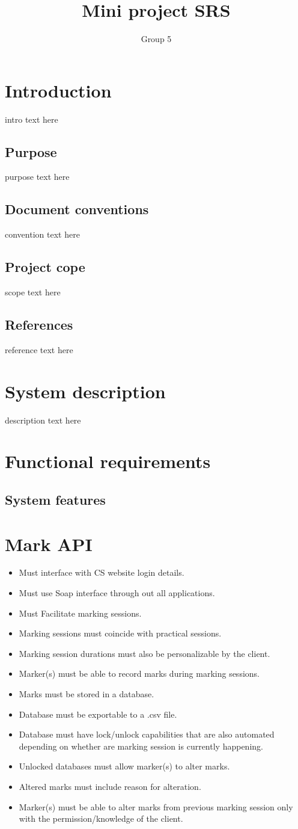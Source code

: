 \documentclass[10pt,a4paper]{article}
\author{Group 5}
\title{Mini project SRS}
\begin{document}
\tableofcontents
\pagebreak
\section{Introduction}
intro text here
\subsection{Purpose}
purpose text here
\subsection{Document conventions}
convention text here
\subsection{Project cope}
scope text here
\subsection{References}
reference text here
\section{System description}
description text here
\section{Functional requirements}
	\subsection{System features}
	\section*{Mark API}
	\begin{itemize}
		\item Must interface with CS website login details.
		\item Must use Soap interface through out all applications.
		\item Must Facilitate marking sessions.
		\item Marking sessions must coincide with practical sessions.
		\item Marking session durations must also be personalizable by the client.
		\item Marker(s) must be able to record marks during marking sessions.
		\item Marks must be stored in a database.
		\item Database must be exportable to a .csv file.
		\item Database must have lock/unlock capabilities that are also automated depending on whether are marking session is currently happening.
		\item Unlocked databases must allow marker(s) to alter marks.
		\item Altered marks must include reason for alteration.
		\item Marker(s) must be able to alter marks from previous marking session only with the permission/knowledge of the client.
	\end{itemize}
\end{document}
